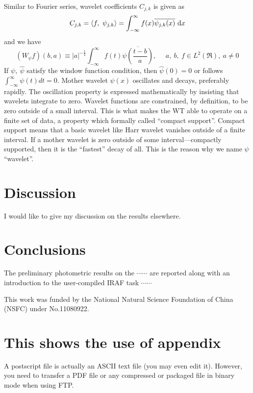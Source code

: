 \documentclass[referee]{raa}            %
\begin{document}
Similar to Fourier series, wavelet coefficients $C_{j,k}$ is given as
\begin{equation}\label{eq5}
  C_{j,k}=\langle f,~\psi_{j,k} \rangle
         =\int_{-\infty}^{\infty} f(x) \overline{\psi_{j,k}(x)} ~{\rm d}x
\end{equation}
and we have
\begin{equation}\label{eq6}
  (W_{\psi}f)(b,a) \equiv |a|^{-\frac{1}{2}} \int_{-\infty}^{\infty} f(t)
  \overline{\psi(\frac{t-b}{a})}, ~~~~~~a,~b,~f\in L^{2}(\Re),~a\neq 0
\end{equation}
If $\psi,~\hat{\psi}$ satisfy the
window function condition, then $\hat{\psi}(0)=0$ or follows $  \int_{-\infty}^{\infty}
\psi(t) dt =0  $. Mother wavelet $\psi(x)$ oscillates and decays,
preferably rapidly. The oscillation property is expressed
mathematically by insisting that wavelets integrate to zero. Wavelet
functions are constrained, by definition, to be zero outside of a
small interval. This is what makes the WT able to operate on a
finite set of data, a property which formally called ``compact
support''. Compact support means that a basic wavelet like Harr
wavelet vanishes outside of a finite interval. If a mother wavelet
is zero outside of some interval---compactly supported, then it is
the ``fastest'' decay of all. This is the reason why we name $\psi$
``wavelet''.




\section{Discussion}
\label{sect:discussion}
I would like to give my discussion on the results elsewhere.


\section{Conclusions}
\label{sect:conclusion}
The preliminary photometric results on the $\cdots\cdots$
are reported along with an introduction to
the user-compiled IRAF task $\cdots\cdots$


\begin{acknowledgements}
This work was funded by the National Natural Science Foundation of China (NSFC)
under No.11080922.
\end{acknowledgements}

\appendix                  %

\section{This shows the use of appendix}
A postscript file is actually an ASCII text file (you may even edit it).
However, you need to transfer a PDF file or any compressed or packaged
file in binary mode when using FTP.
\end{document}
